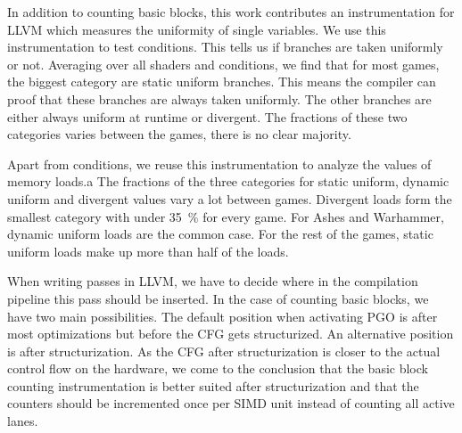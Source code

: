 In addition to counting basic blocks, this work contributes an instrumentation for LLVM which measures the uniformity of single variables.
We use this instrumentation to test conditions.
This tells us if branches are taken uniformly or not.
Averaging over all shaders and conditions, we find that for most games, the biggest category are static uniform branches.
This means the compiler can proof that these branches are always taken uniformly.
The other branches are either always uniform at runtime or divergent.
The fractions of these two categories varies between the games, there is no clear majority.

Apart from conditions, we reuse this instrumentation to analyze the values of memory loads.a
The fractions of the three categories for static uniform, dynamic uniform and divergent values vary a lot between games.
Divergent loads form the smallest category with under \SI{35}{\percent} for every game.
For Ashes and Warhammer, dynamic uniform loads are the common case.
For the rest of the games, static uniform loads make up more than half of the loads.

When writing passes in LLVM, we have to decide where in the compilation pipeline this pass should be inserted.
In the case of counting basic blocks, we have two main possibilities.
The default position when activating PGO is after most optimizations but before the CFG gets structurized.
An alternative position is after structurization.
As the CFG after structurization is closer to the actual control flow on the hardware, we come to the conclusion that the basic block counting instrumentation is better suited after structurization and that the counters should be incremented once per SIMD unit instead of counting all active lanes.
